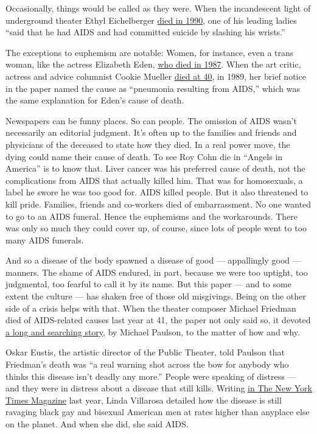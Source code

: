 Occasionally, things would be called as they were. When the incandescent
light of underground theater Ethyl Eichelberger
\href{https://www.nytimes.com/1990/08/14/obituaries/ethyl-eichelberger-performer-45-creator-of-a-gallery-of-characters.html}{died
in 1990}, one of his leading ladies ``said that he had AIDS and had
committed suicide by slashing his wrists.''

The exceptions to euphemism are notable: Women, for instance, even a
trans woman, like the actress Elizabeth Eden,
\href{https://www.nytimes.com/1987/10/01/obituaries/elizabeth-eden-transsexual-who-figured-in-1975-movie.html}{who
died in 1987}. When the art critic, actress and advice columnist Cookie
Mueller
\href{https://www.nytimes.com/1989/11/15/obituaries/cookie-mueller-dead-actress-and-writer-40.html}{died
at 40}, in 1989, her brief notice in the paper named the cause as
``pneumonia resulting from AIDS,'' which was the same explanation for
Eden's cause of death.

Newspapers can be funny places. So can people. The omission of AIDS
wasn't necessarily an editorial judgment. It's often up to the families
and friends and physicians of the deceased to state how they died. In a
real power move, the dying could name their cause of death. To see Roy
Cohn die in ``Angels in America'' is to know that. Liver cancer was his
preferred cause of death, not the complications from AIDS that actually
killed him. That was for homosexuals, a label he swore he was too good
for. AIDS killed people. But it also threatened to kill pride. Families,
friends and co-workers died of embarrassment. No one wanted to go to an
AIDS funeral. Hence the euphemisms and the workarounds. There was only
so much they could cover up, of course, since lots of people went to too
many AIDS funerals.

And so a disease of the body spawned a disease of good --- appallingly
good --- manners. The shame of AIDS endured, in part, because we were
too uptight, too judgmental, too fearful to call it by its name. But
this paper --- and to some extent the culture --- has shaken free of
those old misgivings. Being on the other side of a crisis helps with
that. When the theater composer Michael Friedman died of AIDS-related
causes last year at 41, the paper not only said so, it devoted
\href{https://www.nytimes.com/2017/10/11/theater/michael-friedman-aids-death-theater.html}{a
long and searching story}, by Michael Paulson, to the matter of how and
why.

Oskar Eustis, the artistic director of the Public Theater, told Paulson
that Friedman's death was ``a real warning shot across the bow for
anybody who thinks this disease isn't deadly any more.'' People were
speaking of distress --- and they were in distress about a disease that
still kills. Writing
\href{https://www.nytimes.com/2017/06/06/magazine/americas-hidden-hiv-epidemic.html}{in
The New York Times Magazine} last year, Linda Villarosa detailed how the
disease is still ravaging black gay and bisexual American men at rates
higher than anyplace else on the planet. And when she did, she said
AIDS.

